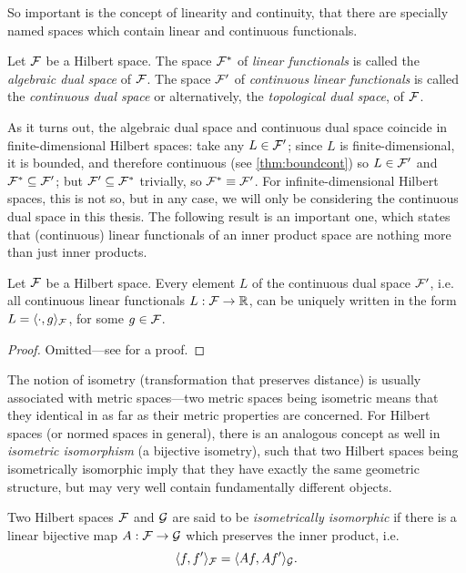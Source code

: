 %
So important is the concept of linearity and continuity, that there are specially named spaces which contain linear and continuous functionals.
%
\begin{definition}
  Let ${\mathcal F}$ be a Hilbert space. 
  The space ${\mathcal F}^*$ of \emph{linear functionals} is called the \emph{algebraic dual space} of ${\mathcal F}$.
  The space ${\mathcal F}'$ of \emph{continuous linear functionals} is called the \emph{continuous dual space} or alternatively, the \emph{topological dual space}, of ${\mathcal F}$.   
\end{definition}
%
As it turns out, the algebraic dual space and continuous dual space coincide in finite-dimensional Hilbert spaces:
take any $L\in{\mathcal F}'$; since $L$ is finite-dimensional, it is bounded, and therefore continuous (see \cref{thm:boundcont}) so $L\in{\mathcal F}'$ and ${\mathcal F}^* \subseteq {\mathcal F}'$; but ${\mathcal F}' \subseteq {\mathcal F}^*$ trivially, so ${\mathcal F}^* \equiv {\mathcal F}'$.
For infinite-dimensional Hilbert spaces, this is not so, but in any case, we will only be considering the continuous dual space in this thesis.
The following result is an important one, which states that (continuous) linear functionals of an inner product space are nothing more than just inner products.

\begin{theorem}
  Let ${\mathcal F}$ be a Hilbert space.
  Every element $L$ of the continuous dual space ${\mathcal F}'$, i.e. all continuous linear functionals $L:{\mathcal F}\to\mathbb{R}$, can be uniquely written in the form $L=\langle\cdot,g\rangle_{\mathcal F}$, for some $g\in{\mathcal F}$.
\end{theorem}

\begin{proof}
  Omitted---see \citet[Theorem 4.12]{rudin1987real} for a proof.
\end{proof}

The notion of isometry (transformation that preserves distance) is usually associated with metric spaces---two metric spaces being isometric means that they identical in as far as their metric properties are concerned.
For Hilbert spaces (or normed spaces in general), there is an analogous concept as well in \emph{isometric isomorphism} (a bijective isometry), such that two Hilbert spaces being isometrically isomorphic imply that they have exactly the same geometric structure, but may very well contain fundamentally different objects.

\begin{definition}
  Two Hilbert spaces ${\mathcal F}$ and ${\mathcal G}$ are said to be \emph{isometrically isomorphic} if there is a linear bijective map $A:{\mathcal F}\to{\mathcal G}$ which preserves the inner product, i.e. 
  \[
    \langle f,f'\rangle_{\mathcal F} = \langle Af,Af'\rangle_{\mathcal G}.
  \]
\end{definition}

